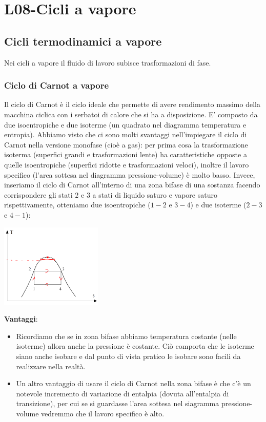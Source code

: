 \section{L08-Cicli a vapore}
\subsection{Cicli termodinamici a vapore}
Nei cicli a vapore il fluido di lavoro subisce trasformazioni di fase.
\subsubsection{Ciclo di Carnot a vapore}
Il ciclo di Carnot è il ciclo ideale che permette di avere rendimento massimo della macchina ciclica con i serbatoi di calore che si ha a disposizione.\newline
\newline
E' composto da due isoentropiche e due isoterme (un quadrato nel diagramma temperatura e entropia).\newline
\newline
Abbiamo visto che ci sono molti svantaggi nell'impiegare il ciclo di Carnot nella versione monofase (cioè a gas): per prima cosa la trasformazione isoterma (superfici grandi e trasformazioni lente) ha caratteristiche opposte a quelle isoentropiche (superfici ridotte e trasformazioni veloci), inoltre il lavoro specifico (l'area sottesa nel diagramma pressione-volume) è molto basso.\newline
\newline
Invece, inseriamo il ciclo di Carnot all'interno di una zona bifase di una sostanza facendo corrispondere gli stati $2$ e $3$ a stati di liquido saturo e vapore saturo rispettivamente, otteniamo due isoentropiche ($1-2$ e $3-4$) e due isoterme ($2-3$ e $4-1$):
\begin{center}
    \includegraphics[height=4cm]{../L08/img1.PNG}
\end{center}
\textbf{Vantaggi}: 
\begin{itemize}
    \item Ricordiamo che se in zona bifase abbiamo temperatura costante (nelle isoterme) allora anche la pressione è costante. Ciò comporta che le isoterme siano anche isobare e dal punto di vista pratico le isobare sono facili da realizzare nella realtà.
    \item Un altro vantaggio di usare il ciclo di Carnot nella zona bifase è che c'è un notevole incremento di variazione di entalpia (dovuta all'entalpia di transizione), per cui se si guardasse l'area sottesa nel siagramma pressione-volume vedremmo che il lavoro specifico è alto.
\end{itemize}
